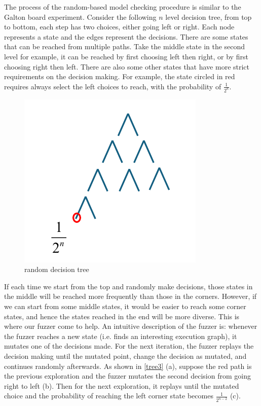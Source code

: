 The process of the random-based model checking procedure is similar to the Galton board experiment. Consider the following $n$ level decision tree, from top to bottom, each step has two choices, either going left or right. Each node represents a state and the edges represent the decisions. There are some states that can be reached from multiple paths. Take the middle state in the second level for example, it can be reached by first choosing left then right, or by first choosing right then left. There are also some other states that have more strict requirements on the decision making. For example, the state circled in red requires always select the left choices to reach, with the probability of $\frac{1}{2^n}$. 
\begin{figure}[htbp] %
    \centering
    \includegraphics[scale=0.5]{figure/tree.pdf} %
    \caption{random decision tree} %
    \label{tree} %
\end{figure}


If each time we start from the top and randomly make decisions, those states in the middle will be reached more frequently than those in the corners. However, if we can start from some middle states, it would be easier to reach some corner states, and hence the states reached in the end will be more diverse. This is where our fuzzer come to help. An intuitive description of the fuzzer is: whenever the fuzzer reaches a new state (i.e. finds an interesting execution graph), it mutates one of the decisions made. For the next iteration, the fuzzer replays the decision making until the mutated point, change the decision as mutated, and continues randomly afterwards. As shown in  \ref{tree3} (a), suppose the red path is the previous exploration and the fuzzer mutates the second decision from going right to left (b). Then for the next exploration, it replays until the mutated choice and the probability of reaching the left corner state becomes $\frac{1}{2^{n-2}}$ (c). 

